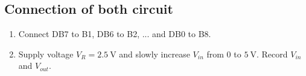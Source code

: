\documentclass[12pt, a4paper]{article}
\begin{document}
\subsection{Connection of both circuit}
\begin{enumerate}[itemsep=0pt]
  \item Connect DB7 to B1, DB6 to B2, ... and DB0 to B8.
  \item Supply voltage $V_R = \SI{2.5}\V$ and slowly increase $V_{in}$ from 
    $0$ to $\SI{5}\V$. Record $V_{in}$ and $V_{out}$.
\end{enumerate}
\end{document}
